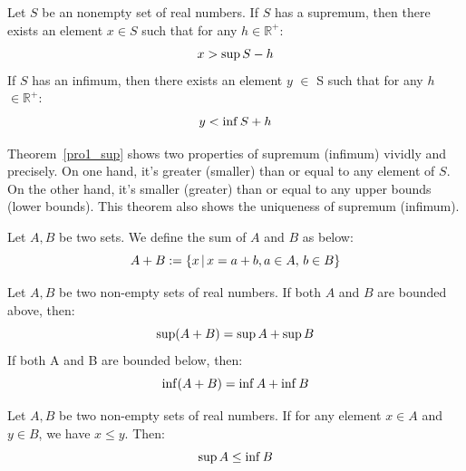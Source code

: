 \documentclass[a4paper]{ctexart}
\begin{document}
	\begin{mythm}\label{pro1_sup}
		Let $S$ be an nonempty set of real numbers. If $S$ has a supremum, then there exists an element $x\in S$  such that for any  $h\in \mathbb{R}^+$:
		\begin{equation}
			x>\sup S-h\notag
		\end{equation} 
		If $S$ has an infimum, then there exists an element $y$ $\in$ S such that for any $h$ $\in \mathbb{R}^+$:
		\begin{equation}
			y<\inf S+h\notag
		\end{equation}
	\end{mythm}
	\begin{myrmk}\label{two_pro_sup}
		Theorem~\ref{pro1_sup} shows two properties of supremum (infimum) vividly and precisely. On one hand, it's greater (smaller) than or equal to any element of $S$. On the other hand, it's smaller (greater) than or equal to any upper bounds (lower bounds). This theorem also shows the uniqueness of supremum (infimum).
	\end{myrmk}
	\begin{mydef}
		Let $A,B$ be two sets. We define the sum of $A$ and $B$ as below:
		\begin{equation}
			A+B:=\{x\, |\, x=a+b,a\in A,\, b \in B\}\notag
		\end{equation}
	\end{mydef}
	\begin{mythm}
		Let $A,B$ be two non-empty sets of real numbers. If both $A$ and $B$ are bounded above, then:
		\begin{equation}
			\sup (A+B)=\sup A+\sup B\notag
		\end{equation}
		If both A and B are bounded below, then:
		\begin{equation}
			\inf(A+B)=\inf A+\inf B\notag
		\end{equation}
	\end{mythm}
	\begin{mythm}
		Let $A,B$ be two non-empty sets of real numbers. If for any element $x\in A$ and $y\in B$, we have $x\le y$. Then:
		\begin{equation}
			\sup A \le \inf B\notag
		\end{equation}
	\end{mythm}
\end{document}

